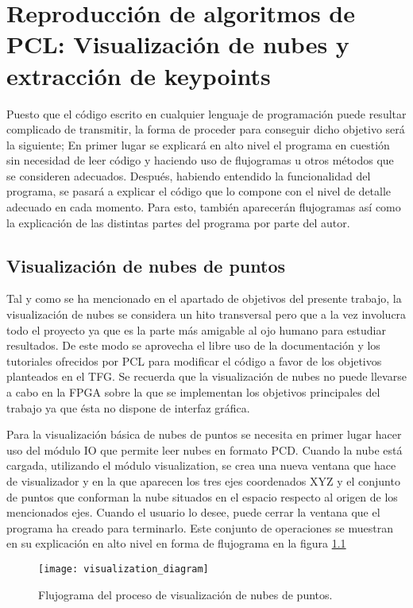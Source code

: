 \chapter{Reproducción de algoritmos de PCL: Visualización de nubes y extracción de keypoints}

Puesto que el código escrito en cualquier lenguaje de programación puede resultar complicado de transmitir, la forma de proceder para conseguir dicho objetivo será la siguiente; En primer lugar se explicará en alto nivel el programa en cuestión sin necesidad de leer código y haciendo uso de flujogramas u otros métodos que se consideren adecuados. Después, habiendo entendido la funcionalidad del programa, se pasará a explicar el código que lo compone con el nivel de detalle adecuado en cada momento. Para esto, también aparecerán flujogramas así como la explicación de las distintas partes del programa por parte del autor.  

\section{Visualización de nubes de puntos}
Tal y como se ha mencionado en el apartado de objetivos del presente trabajo, la visualización de nubes se considera un hito transversal pero que a la vez involucra todo el proyecto ya que es la parte más amigable al ojo humano para estudiar resultados. De este modo se aprovecha el libre uso de la documentación y los tutoriales ofrecidos por PCL para modificar el código a favor de los objetivos planteados en el TFG.
Se recuerda que la visualización de nubes no puede llevarse a cabo en la FPGA sobre la que se implementan los objetivos principales del trabajo ya que ésta no dispone de interfaz gráfica.

Para la visualización básica de nubes de puntos se necesita en primer lugar hacer uso del módulo IO que permite leer nubes en formato PCD. Cuando la nube está cargada, utilizando el módulo visualization, se crea una nueva ventana que hace de visualizador y en la que aparecen los tres ejes coordenados XYZ y el conjunto de puntos que conforman la nube situados en el espacio respecto al origen de los mencionados ejes. Cuando el usuario lo desee, puede cerrar la ventana que el programa ha creado para terminarlo.
Este conjunto de operaciones se muestran en su explicación en alto nivel en forma de flujograma en la figura \ref{fig:visualization_diagram}

\begin{figure}
\centering
\texttt{[image: visualization\_diagram]}
\caption{Flujograma del proceso de visualización de nubes de puntos.}\label{fig:visualization_diagram}
\end{figure}

